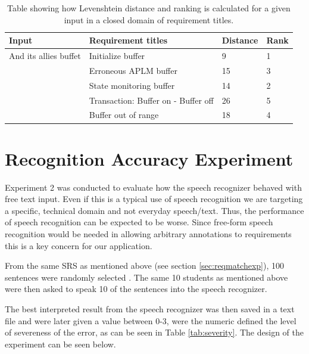 \begin{table}[h]
    \centering
    \caption{Table showing how Levenshtein distance and ranking is calculated for a given input in a closed domain of requirement titles.}
        \begin{tabular}{ l l l l }
            \hline
            Input & Requirement titles & Distance & Rank\\
            \hline
            And its allies buffet & Initialize buffer & 9 & 1 \\
             & Erroneous APLM buffer & 15 & 3 \\
             & State monitoring buffer & 14 & 2 \\
             & Transaction: Buffer on - Buffer off & 26 & 5 \\ 
             & Buffer out of range & 18 & 4 \\ 
            \end{tabular}
    \label{tab:experimentexample}
\end{table}


\section{Recognition Accuracy Experiment}
Experiment 2 was conducted to evaluate how the speech recognizer behaved with free text input.
Even if this is a typical use of speech recognition we are targeting a specific, technical domain and not everyday speech/text.
Thus, the performance of speech recognition can be expected to be worse.
Since free-form speech recognition would be needed in allowing arbitrary annotations to requirements this is a key concern for our application.

From the same SRS as mentioned above (see section \ref{sec:reqmatchexp}), 100 sentences were randomly selected . 
The same 10 students as mentioned above were then asked to speak 10 of the sentences into the speech recognizer.

The best interpreted result from the speech recognizer was then saved in a text file and were later given a value between 0-3, were the numeric defined the level of severeness of the error, as can be seen in Table \ref{tab:severity}. The design of the experiment can be seen below.


